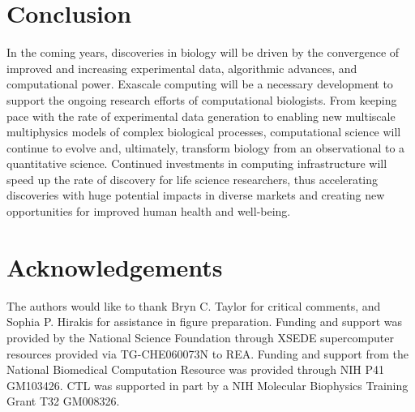 \section{Conclusion}

\par In the coming years, discoveries in biology will be driven by the convergence of improved and increasing experimental data, algorithmic advances, and computational power. Exascale computing will be a necessary development to support the ongoing research efforts of computational biologists. From keeping pace with the rate of experimental data generation to enabling new multiscale multiphysics models of complex biological processes, computational science will continue to evolve and, ultimately, transform biology from an observational to a quantitative science. Continued investments in computing infrastructure will speed up the rate of discovery for life science researchers, thus accelerating discoveries with huge potential impacts in diverse markets and creating new opportunities for improved human health and well-being.

\section{Acknowledgements}
\par {}

\par The authors would like to thank Bryn C. Taylor for critical comments, and Sophia P. Hirakis for assistance in figure preparation. Funding and support was provided by the National Science Foundation through XSEDE supercomputer resources provided via TG-CHE060073N to REA. Funding and support from the National Biomedical Computation Resource was provided through NIH P41 GM103426. CTL was supported in part by a NIH Molecular Biophysics Training Grant T32 GM008326.